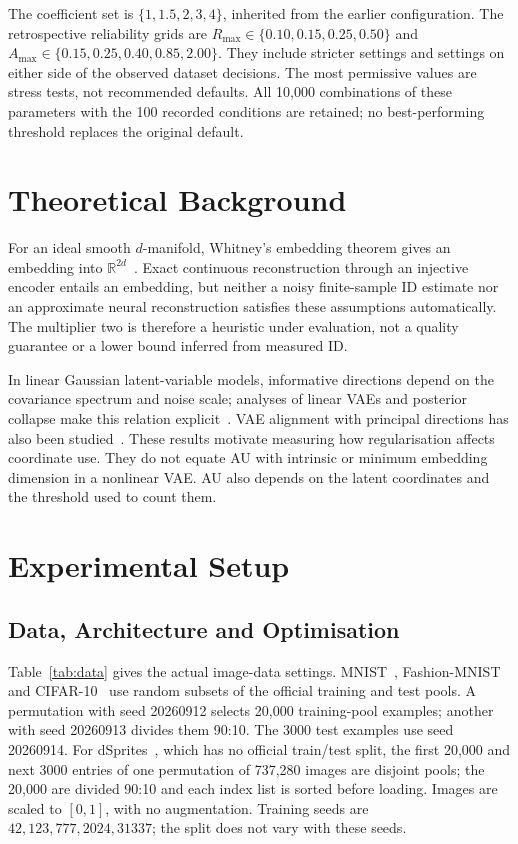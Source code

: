 \documentclass[make,article,submit,pdftex,moreauthors]{Definitions/mdpi}
\begin{document}
The coefficient set is $\{1,1.5,2,3,4\}$, inherited from the earlier
configuration. The retrospective reliability grids are
$R_{\max}\in\{0.10,0.15,0.25,0.50\}$ and
$A_{\max}\in\{0.15,0.25,0.40,0.85,2.00\}$.
They include stricter settings and settings on either side of the observed
dataset decisions. The most permissive values are stress tests, not
recommended defaults. All 10,000 combinations of these parameters with
the 100 recorded conditions are retained; no best-performing threshold
replaces the original default.

\section{Theoretical Background}\label{sec:theory}
For an ideal smooth $d$-manifold, Whitney's embedding theorem gives an
embedding into $\mathbb R^{2d}$~\cite{whitney1944}. Exact continuous
reconstruction through an injective encoder entails an embedding, but
neither a noisy finite-sample ID estimate nor an approximate neural
reconstruction satisfies these assumptions automatically. The multiplier
two is therefore a heuristic under evaluation, not a quality guarantee or
a lower bound inferred from measured ID.

In linear Gaussian latent-variable models, informative directions depend
on the covariance spectrum and noise scale; analyses of linear VAEs and
posterior collapse make this relation explicit~\cite{tippingbishop1999ppca,lucas2019elbo}.
VAE alignment with principal directions has also been
studied~\cite{rolinek2019pca}. These results motivate measuring how
regularisation affects coordinate use. They do not equate AU with
intrinsic or minimum embedding dimension in a nonlinear VAE. AU also
depends on the latent coordinates and the threshold used to count them.

\section{Experimental Setup}\label{sec:setup}

\subsection{Data, Architecture and Optimisation}
Table~\ref{tab:data} gives the actual image-data settings.
MNIST~\cite{lecun1998}, Fashion-MNIST~\cite{xiao2017fashion} and
CIFAR-10~\cite{krizhevsky2009learning} use random subsets of the official
training and test pools. A permutation with seed 20260912 selects 20,000
training-pool examples; another with seed 20260913 divides them 90:10.
The 3000 test examples use seed 20260914. For
dSprites~\cite{matthey2017dsprites}, which has no official train/test
split, the first 20,000 and next 3000 entries of one permutation of
737,280 images are disjoint pools; the 20,000 are divided 90:10 and each
index list is sorted before loading. Images are scaled to $[0,1]$, with
no augmentation. Training seeds are $42,123,777,2024,31337$; the split
does not vary with these seeds.
\end{document}
